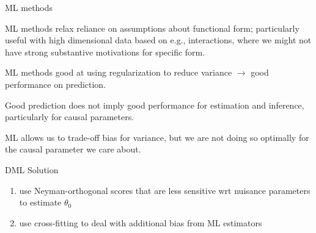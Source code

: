 \documentclass[xcolor={table}, handout]{beamer}
\begin{document}
\note{
\scriptsize \singlespacing

}
\begin{frame}{ML methods}

\begin{wideitemize}
\item ML methods relax reliance on assumptions about functional form; \pause particularly useful with high dimensional data based on e.g., interactions, where we might not have strong substantive motivations for specific form. \pause
\item ML methods good at using regularization to reduce variance \pause $\rightarrow$ good performance on prediction. \pause
\item Good prediction does not imply good performance for estimation and inference, particularly for causal parameters.\pause
\item ML allows us to trade-off bias for variance, but we are not doing so optimally for the causal parameter we care about. 
\end{wideitemize}

\end{frame}


\note{
\scriptsize \singlespacing

}
\begin{frame}{DML Solution}

\begin{enumerate}
\item use Neyman-orthogonal scores that are less sensitive wrt nuisance parameters to estimate $\theta_0$\pause
\item use cross-fitting to deal with additional bias from ML estimators
\end{enumerate}

\end{frame}
\end{document}
